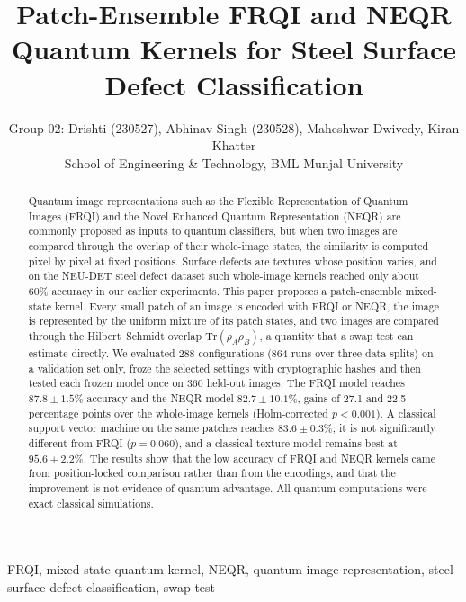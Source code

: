 \documentclass[12pt,onecolumn,draftclsnofoot]{IEEEtran}
\begin{document}
\title{Patch-Ensemble FRQI and NEQR Quantum Kernels for Steel Surface Defect Classification}
\author{Group 02: Drishti (230527), Abhinav Singh (230528), Maheshwar Dwivedy, Kiran Khatter\\
School of Engineering \& Technology, BML Munjal University}
\maketitle

\begin{abstract}
Quantum image representations such as the Flexible Representation of Quantum Images (FRQI) and the Novel Enhanced Quantum Representation (NEQR) are commonly proposed as inputs to quantum classifiers, but when two images are compared through the overlap of their whole-image states, the similarity is computed pixel by pixel at fixed positions. Surface defects are textures whose position varies, and on the NEU-DET steel defect dataset such whole-image kernels reached only about 60\% accuracy in our earlier experiments. This paper proposes a patch-ensemble mixed-state kernel. Every small patch of an image is encoded with FRQI or NEQR, the image is represented by the uniform mixture of its patch states, and two images are compared through the Hilbert--Schmidt overlap $\mathrm{Tr}(\rho_A\rho_B)$, a quantity that a swap test can estimate directly. We evaluated 288 configurations (864 runs over three data splits) on a validation set only, froze the selected settings with cryptographic hashes and then tested each frozen model once on 360 held-out images. The FRQI model reaches $87.8\pm1.5\%$ accuracy and the NEQR model $82.7\pm10.1\%$, gains of 27.1 and 22.5 percentage points over the whole-image kernels (Holm-corrected $p<0.001$). A classical support vector machine on the same patches reaches $83.6\pm0.3\%$; it is not significantly different from FRQI ($p=0.060$), and a classical texture model remains best at $95.6\pm2.2\%$. The results show that the low accuracy of FRQI and NEQR kernels came from position-locked comparison rather than from the encodings, and that the improvement is not evidence of quantum advantage. All quantum computations were exact classical simulations.
\end{abstract}

\begin{IEEEkeywords}
FRQI, mixed-state quantum kernel, NEQR, quantum image representation, steel surface defect classification, swap test
\end{IEEEkeywords}
\end{document}
